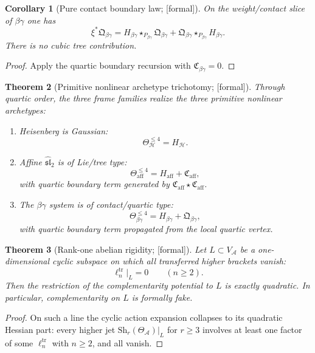 \documentclass[11pt,oneside]{memoir}
\numberwithin{equation}{chapter}
\newtheorem{theorem}{Theorem}[chapter]
\newtheorem{corollary}[theorem]{Corollary}
\theoremstyle{definition}
\newcommand{\ClaimStatusProvedHere}{\textnormal{[formal]}}
\newcommand{\cA}{\mathcal A}
\begin{document}
\begin{corollary}[Pure contact boundary law; \ClaimStatusProvedHere]
\label{cor:nms-betagamma-boundary-law}
On the weight/contact slice of $\beta\gamma$ one has
\[
\xi^*\mathfrak Q_{\beta\gamma}
=
H_{\beta\gamma}\star_{P_{\beta\gamma}}\mathfrak Q_{\beta\gamma}
+
\mathfrak Q_{\beta\gamma}\star_{P_{\beta\gamma}}H_{\beta\gamma}.
\]
There is no cubic tree contribution.
\end{corollary}

\begin{proof}
Apply the quartic boundary recursion with $\mathfrak C_{\beta\gamma}=0$.\qedhere
\end{proof}

\begin{theorem}[Primitive nonlinear archetype trichotomy; \ClaimStatusProvedHere]
\label{thm:nms-archetype-trichotomy}
Through quartic order, the three frame families realize the three primitive nonlinear archetypes:
\begin{enumerate}[label=\textup{(\roman*)}]
\item Heisenberg is Gaussian:
\[
\Theta_{\mathcal H}^{\le 4}=H_{\mathcal H}.
\]
\item Affine $\widehat{\mathfrak{sl}}_2$ is of Lie/tree type:
\[
\Theta_{\mathrm{aff}}^{\le 4}=H_{\mathrm{aff}}+\mathfrak C_{\mathrm{aff}},
\]
with quartic boundary term generated by $\mathfrak C_{\mathrm{aff}}\star \mathfrak C_{\mathrm{aff}}$.
\item The $\beta\gamma$ system is of contact/quartic type:
\[
\Theta_{\beta\gamma}^{\le 4}=H_{\beta\gamma}+\mathfrak Q_{\beta\gamma},
\]
with quartic boundary term propagated from the local quartic vertex.
\end{enumerate}
\end{theorem}

\begin{theorem}[Rank-one abelian rigidity; \ClaimStatusProvedHere]
\label{thm:nms-rank-one-rigidity}
Let $L \subset V_{\cA}$ be a one-dimensional cyclic subspace on which all transferred higher brackets vanish:
\[
\ell_n^{\mathrm{tr}}\big|_L = 0 \qquad (n \ge 2).
\]
Then the restriction of the complementarity potential to $L$ is exactly quadratic.  In particular, complementarity on $L$ is formally fake.
\end{theorem}

\begin{proof}
On such a line the cyclic action expansion collapses to its quadratic Hessian part: every higher jet $\mathrm{Sh}_r(\Theta_{\cA})|_L$ for $r \ge 3$ involves at least one factor of some $\ell_n^{\mathrm{tr}}$ with $n \ge 2$, and all vanish.\qedhere
\end{proof}
\end{document}
